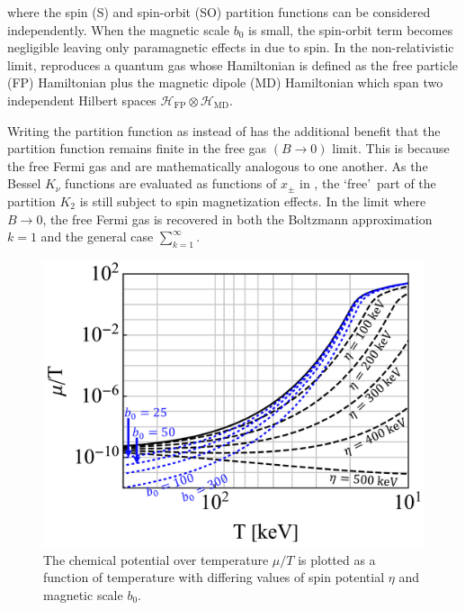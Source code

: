 where the spin (S) and spin-orbit (SO) partition functions can be considered independently. When the magnetic scale $b_{0}$ is small, the spin-orbit term  becomes negligible leaving only paramagnetic effects in  due to spin. In the non-relativistic limit,  reproduces a quantum gas whose Hamiltonian is defined as the free particle (FP) Hamiltonian plus the magnetic dipole (MD) Hamiltonian which span two independent Hilbert spaces $\mathcal{H}_\mathrm{FP}\otimes\mathcal{H}_\mathrm{MD}$.

Writing the partition function as  instead of  has the additional benefit that the partition function remains finite in the free gas $({B}\rightarrow0)$ limit. This is because the free Fermi gas and  are mathematically analogous to one another. As the Bessel $K_{\nu}$ functions are evaluated as functions of $x_{\pm}$ in , the \lq free\rq\ part of the partition $K_{2}$ is still subject to spin magnetization effects. In the limit where ${B}\rightarrow0$, the free Fermi gas is recovered in both the Boltzmann approximation $k=1$ and the general case $\sum_{k=1}^{\infty}$.

\begin{figure}[h]
 \centering
 \includegraphics[clip, trim=0.0cm 0.0cm 0.0cm 0.0cm,width=0.95\linewidth]{plots/chap04cosmo/thesis_chempot.pdf}
 \caption{The chemical potential over temperature $\mu/T$ is plotted as a function of temperature with differing values of spin potential $\eta$ and magnetic scale $b_{0}$.}
 \label{fig:chemicalpotential}
\end{figure}


